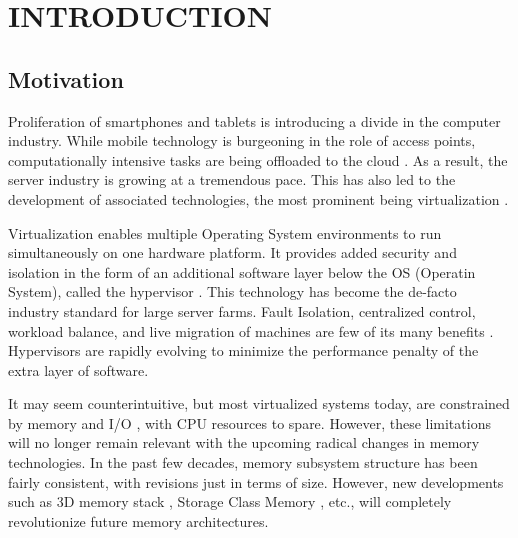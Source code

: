 %
%
%



\pagestyle{plain} %
\setcounter{page}{1}


\chapter{\uppercase {Introduction}}

\section{Motivation}
Proliferation of smartphones and tablets is introducing a divide in the computer industry. While mobile technology is burgeoning in the role of access points, computationally intensive tasks are being offloaded to the cloud \cite{virt_benefits}. As a result, the server industry is growing at a tremendous pace. This has also led to the development of associated technologies, the most prominent being virtualization \cite{virt_back}.

Virtualization enables multiple Operating System environments to run simultaneously on one hardware platform. It provides added security and isolation in the form of an additional software layer below the OS (Operatin System), called the hypervisor \cite{virt_arch}. This technology has become the de-facto industry standard for large server farms. Fault Isolation, centralized control, workload balance, and live migration of machines are few of its many benefits \cite{virt_back}. Hypervisors are rapidly evolving to minimize the performance penalty of the extra layer of software.

It may seem counterintuitive, but most virtualized systems today, are constrained by memory and I/O \cite{virt_io_bottleneck} \cite{virt_bottleneck} \cite{virt_io_bottleneck2}, with CPU resources to spare. However, these limitations will no longer remain relevant with the upcoming radical changes in memory technologies. In the past few decades, memory subsystem structure has been fairly consistent, with revisions just in terms of size. However, new developments such as 3D memory stack \cite{mem_3d1} \cite{mem_3d2}, Storage Class Memory \cite{scm1} \cite{scm2}, etc., will completely revolutionize future memory architectures.

